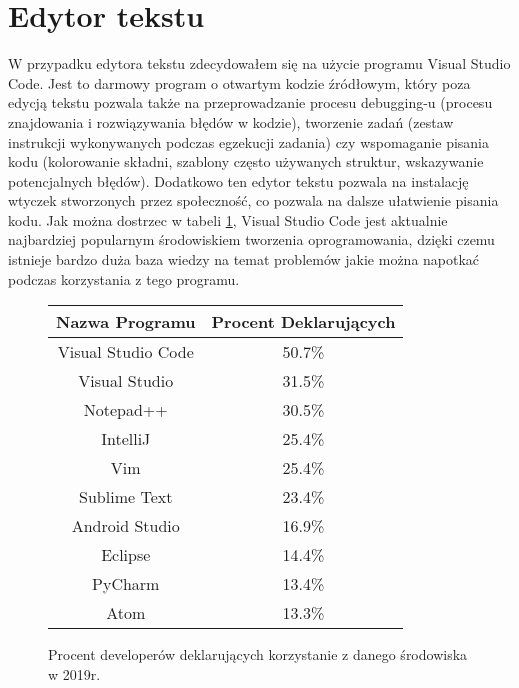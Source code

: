 \documentclass[a4paper,12pt,twoside,openany]{report}
\begin{document}
  \section{Edytor tekstu}
    W przypadku edytora tekstu zdecydowałem się na użycie programu 
    Visual Studio Code. Jest to darmowy program o otwartym kodzie źródłowym, który poza edycją tekstu 
    pozwala także na przeprowadzanie procesu debugging-u (procesu znajdowania i rozwiązywania błędów w kodzie),
    tworzenie zadań (zestaw instrukcji wykonywanych podczas egzekucji zadania) czy wspomaganie pisania kodu 
    (kolorowanie składni, szablony często używanych struktur, wskazywanie potencjalnych błędów).
    Dodatkowo ten edytor tekstu pozwala na instalację wtyczek stworzonych przez społeczność, 
    co pozwala na dalsze ułatwienie pisania kodu. Jak można dostrzec w tabeli \ref{srodowiskoProcenty},
    Visual Studio Code jest aktualnie najbardziej popularnym środowiskiem tworzenia oprogramowania, 
    dzięki czemu istnieje bardzo duża baza wiedzy na temat problemów jakie można napotkać podczas
    korzystania z tego programu.
    \begin{figure}[!htbp]
      \begin{center}
        \centering
          \begin{tabular}{|c|c|}
            \hline
            Nazwa Programu & Procent Deklarujących \\ \hline
            Visual Studio Code & 50.7\% \\ \hline
            Visual Studio & 31.5\% \\ \hline
            Notepad++ & 30.5\% \\ \hline
            IntelliJ & 25.4\% \\ \hline
            Vim & 25.4\% \\ \hline
            Sublime Text & 23.4\% \\ \hline
            Android Studio & 16.9\% \\ \hline
            Eclipse & 14.4\% \\ \hline
            PyCharm & 13.4\% \\ \hline
            Atom & 13.3\% \\
            \hline
          \end{tabular}
      \end{center}
      \caption{Procent developerów deklarujących korzystanie z danego środowiska w 2019r. \cite{StackInsight}}
      \label{srodowiskoProcenty}
    \end{figure}
\end{document}
